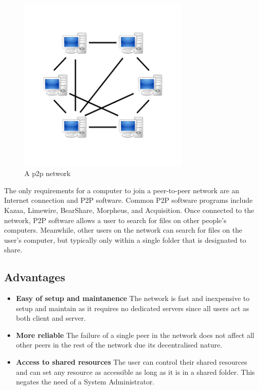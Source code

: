 \documentclass{fisatproject}
\begin{document}
	\begin{center}
		\begin{figure}[h]
			
			\includegraphics[width=8.2cm]{p2p.png}
			\caption{A p2p network}
			
		\end{figure}
	\end{center}
	The only requirements for a computer to join a peer-to-peer network are an Internet connection and P2P software. Common P2P software programs include Kazaa, Limewire, BearShare, Morpheus, and Acquisition. Once connected to the network, P2P software allows a user to search for files on other people's computers. Meanwhile, other users on the network can search for files on the user's computer, but typically only within a single folder that is designated to share. 
	
	\subsection{Advantages}

	\begin{itemize}
		\item \textbf{Easy of setup and maintanence}
		The network is fast and inexpensive to setup and maintain as it requires no dedicated servers since all users act as both client and server.
		
		\item \textbf{More reliable}
		The failure of a single peer in the network does not affect all other peers in the rest of the network due its decentralised nature.
		
		\item \textbf{Access to shared resources}
		The user can control their shared resources and can set any resource as accessible as long as it is in a shared folder. This negates the need of a System Administrator.
		
	\end{itemize}
	
\end{document}
